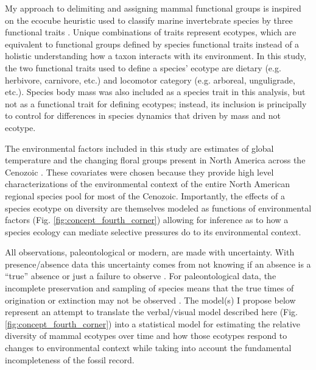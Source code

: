 \documentclass[12pt,letterpaper]{article}
\begin{document}
My approach to delimiting and assigning mammal functional groups is inspired on the ecocube heuristic used to classify marine invertebrate species by three functional traits \citep{Bush2007,Bambach2007,Bush2011,Bush2012b,Novack-Gottshall2007,Villeger2011}. Unique combinations of traits represent ecotypes, which are equivalent to functional groups defined by species functional traits instead of a holistic understanding how a taxon interacts with its environment. In this study, the two functional traits used to define a species' ecotype are dietary (e.g. herbivore, carnivore, etc.) and locomotor category (e.g. arboreal, unguligrade, etc.). Species body mass was also included as a species trait in this analysis, but not as a functional trait for defining ecotypes; instead, its inclusion is principally to control for differences in species dynamics that driven by mass and not ecotype.

The environmental factors included in this study are estimates of global temperature and the changing floral groups present in North America across the Cenozoic \citep{Cramer2011,Graham2011a}. These covariates were chosen because they provide high level characterizations of the environmental context of the entire North American regional species pool for most of the Cenozoic. Importantly, the effects of a species ecotype on diversity are themselves modeled as functions of environmental factors (Fig. \ref{fig:concept_fourth_corner}) allowing for inference as to how a species ecology can mediate selective pressures do to its environmental context. 

All observations, paleontological or modern, are made with uncertainty. With presence/absence data this uncertainty comes from not knowing if an absence is a ``true'' absence or just a failure to observe \citep{Royle2008,Royle2005,Foote1999a,Foote2001,Lloyd2011,Wang2016b}. For paleontological data, the incomplete preservation and sampling of species means that the true times of origination or extinction may not be observed \citep{Foote1999a,Foote2001,Wang2015,Wang2016b}. The model(s) I propose below represent an attempt to translate the verbal/visual model described here (Fig. \ref{fig:concept_fourth_corner}) into a statistical model for estimating the relative diversity of mammal ecotypes over time and how those ecotypes respond to changes to environmental context while taking into account the fundamental incompleteness of the fossil record.
\end{document}
